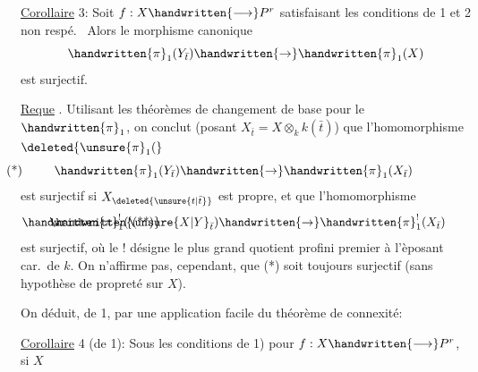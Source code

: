 \uline{Corollaire} 3: Soit $f:X\handwritten{\longrightarrow}P^r$ satisfaisant les conditions de 1\handwritten{,} et 2 non respé.\  Alors le morphisme canonique
\[
\handwritten{\pi}_1(Y_{\bar{t}})\handwritten{\rightarrow}\handwritten{\pi}_1(X)
\]
est surjectif.

\uline{Reque} . Utilisant les théorèmes de changement de base pour le $\handwritten{\pi}_1$, on conclut  (posant $X_{\bar{t}}=X\otimes_k k(\bar{t})$) que l'homomorphisme $\deleted{\unsure{\pi}_1(}$
\[
\handwritten{\pi}_1(Y_{\bar{t}})\handwritten{\rightarrow}\handwritten{\pi}_1(X_{\bar{t}})\tag*{\makebox[0pt][r]{\makebox[\linewidth][l]{(*)}}}
\]
est surjectif si $X_{\deleted{\unsure{t|\bar{t}}}}$ est propre, et que l'homomorphisme
\[
\handwritten{\pi}_1^{!}(\unsure{X|Y}_{\bar{t}})\handwritten{\rightarrow}\handwritten{\pi}_1^{!}(X_{\bar{t}})\tag*{\makebox[0pt][r]{\makebox[\linewidth][l]{\handwritten{(**)}}}}
\]
est surjectif, où le ! désigne le plus grand quotient profini premier à l'èposant car.\ de $k$. On n'affirme pas, cependant, que (*) soit toujours surjectif (sans hypothèse de propreté sur $X$).

On déduit, de 1, par une application facile du théorème de connexité:

\uline{Corollaire} 4 (de 1): Sous les conditions de 1) pour $f:X\handwritten{\longrightarrow}P^r$, si $X$
